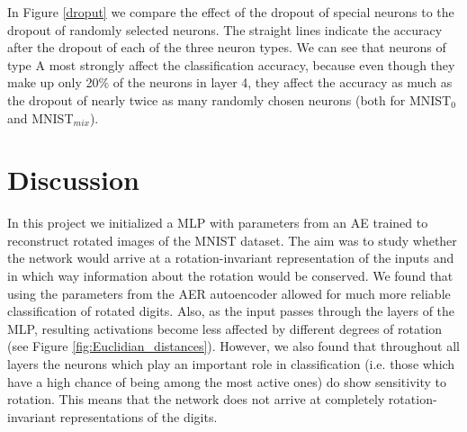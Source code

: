 \documentclass[10pt,a4paper]{article}
\begin{document}
\noindent In Figure \ref{droput} we compare the effect of the dropout of special neurons to the dropout of randomly selected neurons. The straight lines indicate the accuracy after the dropout of each of the three neuron types. We can see that neurons of type A most strongly affect the classification accuracy, because even though they make up only 20\% of the neurons in layer 4, they affect the accuracy as much as the dropout of nearly twice as many randomly chosen neurons (both for MNIST$_0$ and MNIST$_{mix}$). 
\newpage
\section{Discussion}
In this project we initialized a MLP with parameters from an AE trained to reconstruct rotated images of the MNIST dataset. The aim was to study whether the network would arrive at a rotation-invariant representation of the inputs and in which way information about the rotation would be conserved. \newline
\noindent We found that using the parameters from the AER autoencoder allowed for much more reliable classification of rotated digits. Also, as the input passes through the layers of the MLP, resulting activations become less affected by different degrees of rotation (see Figure \ref{fig:Euclidian_distances}).  
However, we also found that throughout all layers the neurons which play an important role in classification (i.e. those which have a high chance of being among the most active ones) do show sensitivity to rotation. This means that the network does not arrive at completely rotation-invariant representations of the digits. 
\end{document}

